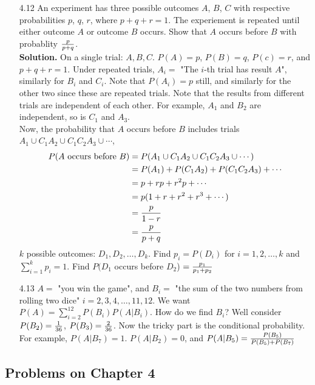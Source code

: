 \documentclass[english, 11pt]{article}
\begin{document}
  \begin{itemize}
    \item[4.12] An experiment has three possible outcomes $A$, $B$, $C$ with respective probabilities $p$, $q$, $r$, where $p + q + r = 1$. The experiement is repeated until either outcome $A$ or outcome $B$ occurs. Show that $A$ occurs before $B$ with probablity $\frac{p}{p+q}$. \\

    \textbf{Solution.} On a single trial: $A, B, C$. $P(A) = p$, $P(B) = q$, $P(c) = r$, and $p + q + r = 1$. Under repeated trials, $A_i = $ "The $i$-th trial has result $A$", similarly for $B_i$ and $C_i$. Note that $P(A_i) = p$ still, and similarly for the other two since these are repeated trials. Note that the results from different trials are independent of each other. For example, $A_1$ and $B_2$ are independent, so is $C_1$ and $A_3$. \\

    Now, the probability that $A$ occurs before $B$ includes trials $A_1 \cup C_1A_2 \cup C_1C_2A_3 \cup \cdots$,
    \begin{align*}
      P(\mbox{$A$ occurs before $B$}) & = P(A_1 \cup C_1A_2 \cup C_1C_2A_3 \cup \cdots) \\
                                      & = P(A_1) + P(C_1A_2) + P(C_1C_2A_3) + \cdots \\
                                      & = p + rp + r^2p + \cdots \\
                                      & = p(1 + r + r^2 + r^3 + \cdots) \\
                                      & = \frac{p}{1-r} \\
                                      & = \frac{p}{p+q}
    \end{align*}
    $k$ possible outcomes: $D_1, D_2, \ldots, D_k$. Find $p_i = P(D_i)$ for $i = 1,2,\ldots, k$ and $\sum_{i=1}^k p_i = 1$. Find $P(D_1$ occurs before $D_2$) $= \frac{p_1}{p_1+p_2}$
    \item[4.13] $A = $ "you win the game", and $B_i = $ "the sum of the two numbers from rolling two dice" $i = 2,3,4,\ldots,11,12$. We want $P(A) = \sum_{i=2}^{12} P(B_i)P(A|B_i)$. How do we find $B_i$? Well consider $P(B_2) = \frac{1}{36}$, $P(B_3) = \frac{2}{36}$. Now the tricky part is the conditional probability. For example, $P(A|B_7) = 1$. $P(A | B_2) = 0$, and $P(A|B_5) = \frac{P(B_5)}{P(B_5) + P(B_7)}$
  \end{itemize}

  \subsection{Problems on Chapter 4}
\end{document}
